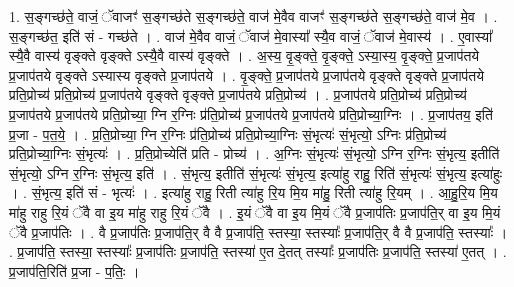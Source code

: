 \documentclass[17pt]{extarticle}
\begin{document}
1. स॒ङ्गच्छ॑ते॒ वाजं॒ ॅवाजꣳ॑ स॒ङ्गच्छ॑ते स॒ङ्गच्छ॑ते॒ वाज॑ मे॒वैव वाजꣳ॑ स॒ङ्गच्छ॑ते स॒ङ्गच्छ॑ते॒ वाज॑ मे॒व । . स॒ङ्गच्छ॑त॒ इति॑ सं - गच्छ॑ते । . वाज॑ मे॒वैव वाजं॒ ॅवाज॑ मे॒वास्या᳚ स्यै॒व वाजं॒ ॅवाज॑ मे॒वास्य॑ । . ए॒वास्या᳚ स्यै॒वै वास्य॑ वृङ्क्ते वृङ्क्ते ऽस्यै॒वै वास्य॑ वृङ्क्ते । . अ॒स्य॒ वृ॒ङ्क्ते॒ वृ॒ङ्क्ते॒ ऽस्या॒स्य॒ वृ॒ङ्क्ते॒ प्र॒जाप॑तये प्र॒जाप॑तये वृङ्क्ते ऽस्यास्य वृङ्क्ते प्र॒जाप॑तये । . वृ॒ङ्क्ते॒ प्र॒जाप॑तये प्र॒जाप॑तये वृङ्क्ते वृङ्क्ते प्र॒जाप॑तये प्रति॒प्रोच्य॑ प्रति॒प्रोच्य॑ प्र॒जाप॑तये वृङ्क्ते वृङ्क्ते प्र॒जाप॑तये प्रति॒प्रोच्य॑ । . प्र॒जाप॑तये प्रति॒प्रोच्य॑ प्रति॒प्रोच्य॑ प्र॒जाप॑तये प्र॒जाप॑तये प्रति॒प्रोच्या॒ ग्नि र॒ग्निः प्र॑ति॒प्रोच्य॑ प्र॒जाप॑तये प्र॒जाप॑तये प्रति॒प्रोच्या॒ग्निः । . प्र॒जाप॑तय॒ इति॑ प्र॒जा - प॒त॒ये॒ । . प्र॒ति॒प्रोच्या॒ ग्नि र॒ग्निः प्र॑ति॒प्रोच्य॑ प्रति॒प्रोच्या॒ग्निः सं॒भृत्यः॑ सं॒भृत्यो॒ ऽग्निः प्र॑ति॒प्रोच्य॑ प्रति॒प्रोच्या॒ग्निः सं॒भृत्यः॑ । . प्र॒ति॒प्रोच्येति॑ प्रति - प्रोच्य॑ । . अ॒ग्निः सं॒भृत्यः॑ सं॒भृत्यो॒ ऽग्नि र॒ग्निः सं॒भृत्य॒ इतीति॑ सं॒भृत्यो॒ ऽग्नि र॒ग्निः सं॒भृत्य॒ इति॑ । . सं॒भृत्य॒ इतीति॑ सं॒भृत्यः॑ सं॒भृत्य॒ इत्या॑हु राहु॒ रिति॑ सं॒भृत्यः॑ सं॒भृत्य॒ इत्या॑हुः । . सं॒भृत्य॒ इति॑ सं - भृत्यः॑ । . इत्या॑हु राहु॒ रिती त्या॑हु रि॒य मि॒य मा॑हु॒ रिती त्या॑हु रि॒यम् । . आ॒हु॒रि॒य मि॒य मा॑हु राहु रि॒यं ॅवै वा इ॒य मा॑हु राहु रि॒यं ॅवै । . इ॒यं ॅवै वा इ॒य मि॒यं ॅवै प्र॒जाप॑तिः प्र॒जाप॑ति॒र् वा इ॒य मि॒यं ॅवै प्र॒जाप॑तिः । . वै प्र॒जाप॑तिः प्र॒जाप॑ति॒र् वै वै प्र॒जाप॑ति॒ स्तस्या॒ स्तस्याः᳚ प्र॒जाप॑ति॒र् वै वै प्र॒जाप॑ति॒ स्तस्याः᳚ । . प्र॒जाप॑ति॒ स्तस्या॒ स्तस्याः᳚ प्र॒जाप॑तिः प्र॒जाप॑ति॒ स्तस्या॑ ए॒त दे॒तत् तस्याः᳚ प्र॒जाप॑तिः प्र॒जाप॑ति॒ स्तस्या॑ ए॒तत् । . प्र॒जाप॑ति॒रिति॑ प्र॒जा - प॒तिः॒ । \newline
\end{document}
